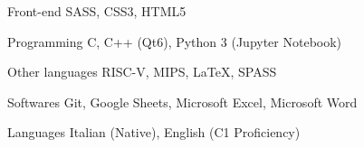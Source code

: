 

\begin{cvskills}

  \cvskill
    {Front-end} %
    {SASS, CSS3, HTML5} %

  \cvskill
    {Programming} %
    {C, C++ (Qt6), Python 3 (Jupyter Notebook)} %

  \cvskill
    {Other languages} %
    {RISC-V, MIPS, LaTeX, SPASS} %

  \cvskill
    {Softwares} %
    {Git, Google Sheets, Microsoft Excel, Microsoft Word} %

  \cvskill
    {Languages} %
    {Italian (Native), English (C1 Proficiency)} %

\end{cvskills}
